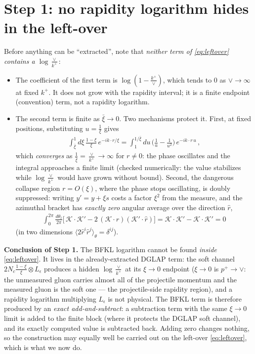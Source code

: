 \documentclass[10pt]{article}
\newcommand{\Leps}{L_{\epsilon}}
\begin{document}
\section{Step 1: no rapidity logarithm hides in the left-over}
Before anything can be ``extracted'', note that \emph{neither term of \eqref{eq:leftover}
contains a $\log\frac{\vee}{k^{+}}$}:
\begin{itemize}
\item[(i)] The coefficient of the first term is $\log(1-\frac{k^{+}}{\vee})$, which tends to
$0$ as $\vee\to\infty$ at fixed $k^{+}$. It does not grow with the rapidity interval; it is a
finite endpoint (convention) term, not a rapidity logarithm.
\item[(ii)] The second term is finite as $\bar\xi\to0$. Two mechanisms protect it.
First, at fixed positions, substituting $u=\frac1\xi$ gives
\begin{align}
\int_{\bar\xi}^{1}d\xi\,\frac{1-\xi}{\xi}\,e^{-ik\cdot r/\xi}
=\int_{1}^{1/\bar\xi}du\,\Big(\frac{1}{u}-\frac{1}{u^{2}}\Big)\,e^{-ik\cdot r\,u}\,,
\end{align}
which \emph{converges} as $\frac{1}{\bar\xi}=\frac{\vee}{k^{+}}\to\infty$ for $r\neq0$: the
phase oscillates and the integral approaches a finite limit (checked numerically: the value
stabilizes while $\log\frac{\vee}{k^{+}}$ would have grown without bound). Second, the
dangerous collapse region $r=O(\xi)$, where the phase stops oscillating, is doubly suppressed:
writing $y'=y+\xi s$ costs a factor $\xi^{2}$ from the measure, and the azimuthal bracket has
\emph{exactly zero} angular average over the direction $\hat r$,
\begin{align}
\int_{0}^{2\pi}\frac{d\theta_{\hat r}}{2\pi}
\Big[\,\mathcal K\!\cdot\!\mathcal K'-2\,(\mathcal K\!\cdot\!\hat r)(\mathcal K'\!\cdot\!\hat r)\Big]
=\mathcal K\!\cdot\!\mathcal K'-\mathcal K\!\cdot\!\mathcal K'=0
\end{align}
(in two dimensions $\langle2\hat r^{i}\hat r^{j}\rangle_{\theta}=\delta^{ij}$).
\end{itemize}
\textbf{Conclusion of Step 1.} The BFKL logarithm cannot be found \emph{inside}
\eqref{eq:leftover}. It lives in the already-extracted DGLAP term: the soft channel
$2N_{c}\frac{1-\xi}{\xi}\otimes\Leps$ produces a hidden $\log\frac{\vee}{k^{+}}$ at its
$\xi\to0$ endpoint ($\xi\to0$ is $p^{+}\to\vee$: the unmeasured gluon carries almost all of the
projectile momentum and the measured gluon is the soft one --- the projectile-side rapidity
region), and a rapidity logarithm multiplying $\Leps$ is not physical. The BFKL term is
therefore produced by an \emph{exact add-and-subtract}: a subtraction term with the same
$\xi\to0$ limit is added to the finite block (where it protects the DGLAP soft channel), and
its exactly computed value is subtracted back. Adding zero changes nothing, so the construction
may equally well be carried out on the left-over \eqref{eq:leftover}, which is what we now do.
\end{document}
